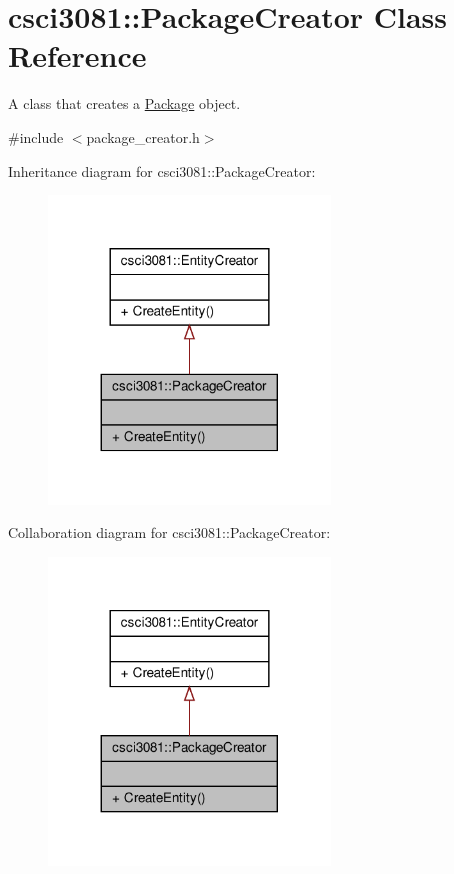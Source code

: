 \hypertarget{classcsci3081_1_1PackageCreator}{}\section{csci3081\+:\+:Package\+Creator Class Reference}
\label{classcsci3081_1_1PackageCreator}


A class that creates a \hyperlink{classcsci3081_1_1Package}{Package} object.  




{\ttfamily \#include $<$package\+\_\+creator.\+h$>$}



Inheritance diagram for csci3081\+:\+:Package\+Creator\+:\nopagebreak
\begin{figure}[H]
\begin{center}
\leavevmode
\includegraphics[width=212pt]{classcsci3081_1_1PackageCreator__inherit__graph}
\end{center}
\end{figure}


Collaboration diagram for csci3081\+:\+:Package\+Creator\+:\nopagebreak
\begin{figure}[H]
\begin{center}
\leavevmode
\includegraphics[width=212pt]{classcsci3081_1_1PackageCreator__coll__graph}
\end{center}
\end{figure}
